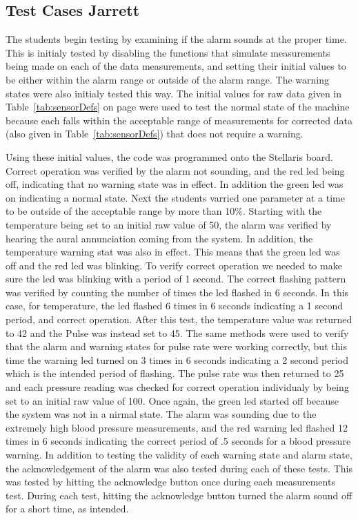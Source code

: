 \documentclass[12pt]{article} %
\begin{document}
\subsection{Test Cases  Jarrett}

The students begin testing by examining if the alarm sounds at the proper time.
This is initialy tested by disabling the functions that simulate measurements
being made on each of the data measurements, and setting their initial values
to be either within the alarm range or outside of the alarm range. The warning
states were also initialy tested this way. The initial values for raw data
given in Table~\ref{tab:sensorDefs} on page \pageref{tab:sensorDefs} were used to test the normal state of the
machine because each falls within the acceptable range of measurements for
corrected data (also given in Table~\ref{tab:sensorDefs}) that does not require a
warning.
	
Using these initial values, the code was programmed onto the Stellaris board.
Correct operation was verified by the alarm not sounding, and the red led being
off, indicating that no warning state was in effect. In addition the green led
was on indicating a normal state. Next the students varried one parameter at a
time to be outside of the acceptable range by more than 10\%. Starting with the
temperature being set to an initial raw value of 50, the alarm was verified by
hearing the aural annunciation coming from the system. In addition, the
temperature warning stat was also in effect. This means that the green led was
off and the red led was blinking. To verify correct operation we needed to make
sure the led was blinking with a period of 1 second. The correct flashing
pattern was verified by counting the number of times the led flashed in 6
seconds. In this case, for temperature, the led flashed 6 times in 6 seconds
indicating a 1 second period, and correct operation. After this test, the
temperature value was returned to 42 and the Pulse was instead set to 45. The
same methods were used to verify that the alarm and warning states for pulse
rate were working correctly, but this time the warning led turned on 3 times in
6 seconds indicating a 2 second period which is the intended period of
flashing. The pulse rate was then returned to 25 and each pressure reading was
checked for correct operation individualy by being set to an initial raw value
of 100. Once again, the green led started off because the system was not in a
nirmal state. The alarm was sounding due to the extremely high blood pressure
measurements, and the red warning led flashed 12 times in 6 seconds indicating
the correct period of .5 seconds for a blood pressure warning. In addition to
testing the validity of each warning state and alarm state, the acknowledgement
of the alarm was also tested during each of these tests. This was tested by
hitting the acknowledge button once during each measurements test. During each
test, hitting the acknowledge button turned the alarm sound off for a short
time, as intended. 
\end{document}
